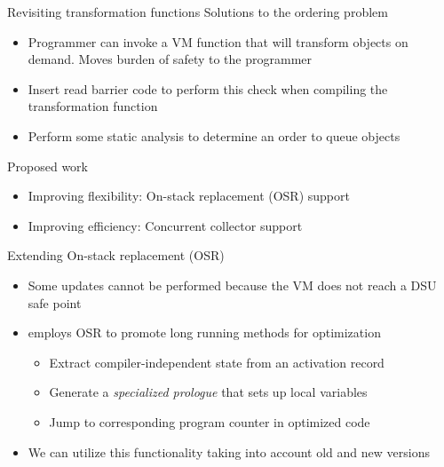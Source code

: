 \ifdraft{}{



}

\begin{frame}[t,fragile]{Revisiting transformation functions}%
Solutions to the ordering problem \\
\begin{itemize}
\item Programmer can invoke a VM function that will transform objects on
demand. Moves burden of safety to the programmer
\item<2-> Insert read barrier code to perform this check when compiling the
transformation function
\item<2-> Perform some static analysis to determine an order to queue
objects
\end{itemize}
\end{frame}

\begin{frame}{Proposed work}%
\begin{itemize}
\item Improving flexibility: On-stack replacement (OSR) support
\item Improving efficiency: Concurrent collector support
\end{itemize}
\end{frame}

\begin{frame}[t,fragile]{Extending On-stack replacement (OSR)}%
\begin{itemize}
\item Some updates cannot be performed because the VM does not reach a DSU
      safe point
\item \JikesRVM{} employs OSR to promote long running methods for
      optimization
      \begin{itemize}
      \item Extract compiler-independent state from an activation record
      \item Generate a \emph{specialized prologue} that sets up local
            variables
      \item Jump to corresponding program counter in optimized code
      \end{itemize}
\item We can utilize this functionality taking into account old and new
versions
\end{itemize}
\end{frame}

